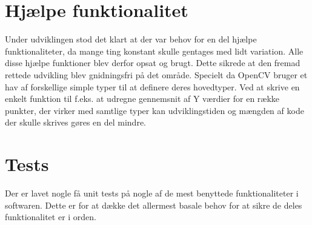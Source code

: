 \section{Hjælpe funktionalitet}
Under udviklingen stod det klart at der var behov for en del hjælpe funktionaliteter, da mange ting konstant skulle gentages med lidt variation. Alle disse hjælpe funktioner blev derfor opsat og brugt. Dette sikrede at den fremad rettede udvikling blev gnidningsfri på det område.
Specielt da OpenCV bruger et hav af forskellige simple typer til at definere deres hovedtyper. Ved at skrive en enkelt funktion til f.eks. at udregne gennemsnit af Y værdier for en række punkter, der virker med samtlige typer kan udviklingstiden og mængden af kode der skulle skrives gøres en del mindre.

\section{Tests}
Der er lavet nogle få unit tests på nogle af de mest benyttede funktionaliteter i softwaren. Dette er for at dække det allermest basale behov for at sikre de deles funktionalitet er i orden.

\
